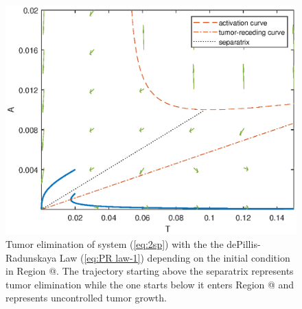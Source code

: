 \documentclass[review,authoryear]{elsarticle}
\makeatletter
\newcommand*{\rom}[1]{\expandafter\@slowromancap\romannumeral #1@}
\makeatother
\begin{document}
\begin{figure}
\centerline{\includegraphics[width=0.7\linewidth]{figs/dP-PP-sep}}

\caption{\label{fig:dP-PP-sep}Tumor elimination of system (\ref{eq:2sp}) with the the dePillis-Radunskaya Law (\ref{eq:PR law-1}) depending on the initial condition
in Region \rom{1}. The trajectory starting above the separatrix represents tumor
elimination while the one starts below it enters Region \rom{2} and represents
uncontrolled tumor growth. }
\end{figure}
\end{document}
